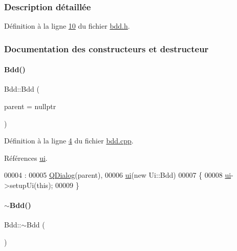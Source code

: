 \subsubsection{Description détaillée}


Définition à la ligne \hyperlink{bdd_8h_source_l00010}{10} du fichier \hyperlink{bdd_8h_source}{bdd.\+h}.



\subsubsection{Documentation des constructeurs et destructeur}
\mbox{\label{class_bdd_a9b439e0eaab93fcea818892e1daf809b}} 
\paragraph{\texorpdfstring{Bdd()}{Bdd()}}
{\footnotesize\ttfamily Bdd\+::\+Bdd (\begin{DoxyParamCaption}\item[{\hyperlink{class_q_widget}{Q\+Widget} $\ast$}]{parent = {\ttfamily nullptr} }\end{DoxyParamCaption})\hspace{0.3cm}{\ttfamily [explicit]}}



Définition à la ligne \hyperlink{bdd_8cpp_source_l00004}{4} du fichier \hyperlink{bdd_8cpp_source}{bdd.\+cpp}.



Références \hyperlink{bdd_8h_source_l00019}{ui}.


\begin{DoxyCode}
00004                         :
00005     \hyperlink{class_q_dialog}{QDialog}(parent),
00006     \hyperlink{class_bdd_a7d9f43a44caaddb2f5ccd728ecc78c2a}{ui}(\textcolor{keyword}{new} Ui::Bdd)
00007 \{
00008     \hyperlink{class_bdd_a7d9f43a44caaddb2f5ccd728ecc78c2a}{ui}->setupUi(\textcolor{keyword}{this});
00009 \}
\end{DoxyCode}
\mbox{\label{class_bdd_a5029277f27f8cfcf9d8603fb331a15dd}} 
\paragraph{\texorpdfstring{$\sim$\+Bdd()}{~Bdd()}}
{\footnotesize\ttfamily Bdd\+::$\sim$\+Bdd (\begin{DoxyParamCaption}{ }\end{DoxyParamCaption})}



